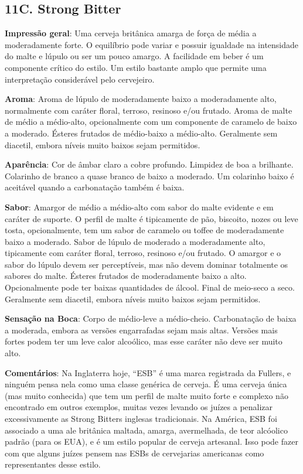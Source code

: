 \subsection*{11C. Strong Bitter}
\textbf{Impressão geral}: Uma cerveja britânica amarga de força de média a moderadamente forte. O equilíbrio pode variar e possuir igualdade na intensidade do malte e lúpulo ou ser um pouco amargo. A facilidade em beber é um componente crítico do estilo. Um estilo bastante amplo que permite uma interpretação considerável pelo cervejeiro.

\textbf{Aroma}: Aroma de lúpulo de moderadamente baixo a moderadamente alto, normalmente com caráter floral, terroso, resinoso e/ou frutado. Aroma de malte de médio a médio-alto, opcionalmente com um componente de caramelo de baixo a moderado. Ésteres frutados de médio-baixo a médio-alto. Geralmente sem diacetil, embora níveis muito baixos sejam permitidos.

\textbf{Aparência}: Cor de âmbar claro a cobre profundo. Limpidez de boa a brilhante. Colarinho de branco a quase branco de baixo a moderado. Um colarinho baixo é aceitável quando a carbonatação também é baixa.

\textbf{Sabor}: Amargor de médio a médio-alto com sabor do malte evidente e em caráter de suporte. O perfil de malte é tipicamente de pão, biscoito, nozes ou leve tosta, opcionalmente, tem um sabor de caramelo ou toffee de moderadamente baixo a moderado. Sabor de lúpulo de moderado a moderadamente alto, tipicamente com caráter floral, terroso, resinoso e/ou frutado. O amargor e o sabor do lúpulo devem ser perceptíveis, mas não devem dominar totalmente os sabores do malte. Ésteres frutados de moderadamente baixo a alto. Opcionalmente pode ter baixas quantidades de álcool. Final de meio-seco a seco. Geralmente sem diacetil, embora níveis muito baixos sejam permitidos.

\textbf{Sensação na Boca}: Corpo de médio-leve a médio-cheio. Carbonatação de baixa a moderada, embora as versões engarrafadas sejam mais altas. Versões mais fortes podem ter um leve calor alcoólico, mas esse caráter não deve ser muito alto.

\textbf{Comentários}: Na Inglaterra hoje, “ESB” é uma marca registrada da Fullers, e ninguém pensa nela como uma classe genérica de cerveja. É uma cerveja única (mas muito conhecida) que tem um perfil de malte muito forte e complexo não encontrado em outros exemplos, muitas vezes levando os juízes a penalizar excessivamente as Strong Bitters inglesas tradicionais. Na América, ESB foi associado a uma ale britânica maltada, amarga, avermelhada, de teor alcóolico padrão (para os EUA), e é um estilo popular de cerveja artesanal. Isso pode fazer com que alguns juízes pensem nas ESBs de cervejarias americanas como representantes desse estilo.

